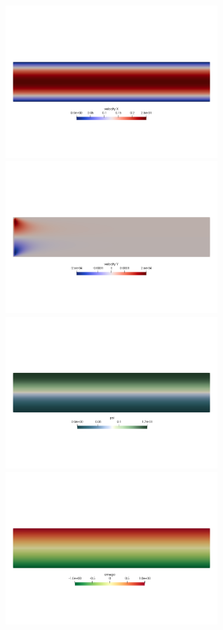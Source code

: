 \begin{center}
\includegraphics[width=8cm]{python_codes/fieldstone_154/results/u}
\includegraphics[width=8cm]{python_codes/fieldstone_154/results/v}\\
\includegraphics[width=8cm]{python_codes/fieldstone_154/results/psi}
\includegraphics[width=8cm]{python_codes/fieldstone_154/results/omega}
\end{center}


